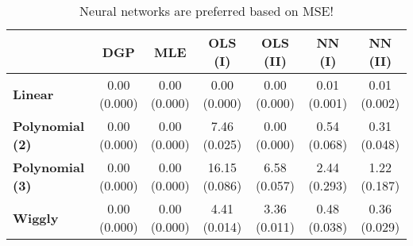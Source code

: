 \begin{table}[t]
\centering
\begin{threeparttable}
\caption{Neural networks are preferred  based on MSE!}
\label{4_simulation_single_table_mrgeff_MMSE}
\begin{tabular}{l|cccccc}\toprule
& \textbf{DGP} & \textbf{MLE} & \textbf{OLS (I)} & \textbf{OLS (II)} & \textbf{NN (I)} & \textbf{NN (II)}\\\midrule
\vspace{6pt}\textbf{Linear} & \cellbreak[t]{0.00\\\footnotesize(0.000)} & \cellbreak[t]{0.00\\\footnotesize(0.000)} & \cellbreak[t]{0.00\\\footnotesize(0.000)} & \cellbreak[t]{0.00\\\footnotesize(0.000)} & \cellbreak[t]{0.01\\\footnotesize(0.001)} & \cellbreak[t]{0.01\\\footnotesize(0.002)}\\
\vspace{6pt}\textbf{Polynomial (2)} & \cellbreak[t]{0.00\\\footnotesize(0.000)} & \cellbreak[t]{0.00\\\footnotesize(0.000)} & \cellbreak[t]{7.46\\\footnotesize(0.025)} & \cellbreak[t]{0.00\\\footnotesize(0.000)} & \cellbreak[t]{0.54\\\footnotesize(0.068)} & \cellbreak[t]{0.31\\\footnotesize(0.048)}\\
\vspace{6pt}\textbf{Polynomial (3)} & \cellbreak[t]{0.00\\\footnotesize(0.000)} & \cellbreak[t]{0.00\\\footnotesize(0.000)} & \cellbreak[t]{16.15\\\footnotesize(0.086)} & \cellbreak[t]{6.58\\\footnotesize(0.057)} & \cellbreak[t]{2.44\\\footnotesize(0.293)} & \cellbreak[t]{1.22\\\footnotesize(0.187)}\\
\vspace{6pt}\textbf{Wiggly} & \cellbreak[t]{0.00\\\footnotesize(0.000)} & \cellbreak[t]{0.00\\\footnotesize(0.000)} & \cellbreak[t]{4.41\\\footnotesize(0.014)} & \cellbreak[t]{3.36\\\footnotesize(0.011)} & \cellbreak[t]{0.48\\\footnotesize(0.038)} & \cellbreak[t]{0.36\\\footnotesize(0.029)}\\

\end{tabular}
\end{threeparttable}
\end{table}
